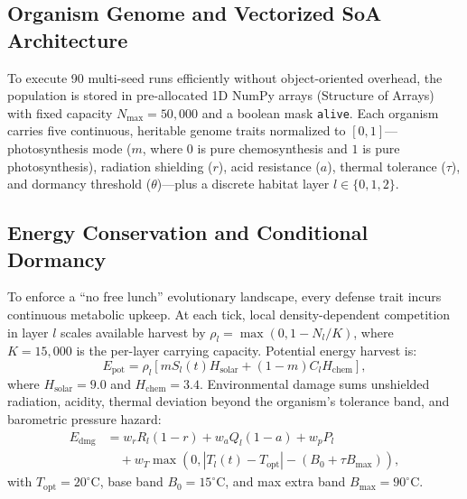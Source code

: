 \documentclass[conference]{IEEEtran}
\begin{document}
\subsection{Organism Genome and Vectorized SoA Architecture}
To execute 90 multi-seed runs efficiently without object-oriented overhead, the population is stored in pre-allocated 1D NumPy arrays (Structure of Arrays) with fixed capacity $N_{\max} = 50{,}000$ and a boolean mask \texttt{alive}. Each organism carries five continuous, heritable genome traits normalized to $[0, 1]$---photosynthesis mode ($m$, where $0$ is pure chemosynthesis and $1$ is pure photosynthesis), radiation shielding ($r$), acid resistance ($a$), thermal tolerance ($\tau$), and dormancy threshold ($\theta$)---plus a discrete habitat layer $l \in \{0, 1, 2\}$.

\subsection{Energy Conservation and Conditional Dormancy}
To enforce a ``no free lunch'' evolutionary landscape, every defense trait incurs continuous metabolic upkeep. At each tick, local density-dependent competition in layer $l$ scales available harvest by $\rho_l = \max(0, 1 - N_l / K)$, where $K = 15{,}000$ is the per-layer carrying capacity. Potential energy harvest is:
\begin{equation}
    E_{\text{pot}} = \rho_l \left[ m S_l(t) H_{\text{solar}} + (1 - m) C_l H_{\text{chem}} \right],
\end{equation}
where $H_{\text{solar}} = 9.0$ and $H_{\text{chem}} = 3.4$. Environmental damage sums unshielded radiation, acidity, thermal deviation beyond the organism's tolerance band, and barometric pressure hazard:
\begin{align}
    E_{\text{dmg}} &= w_r R_l (1 - r) + w_a Q_l (1 - a) + w_p P_l \nonumber \\
                   &\quad + w_T \max\left(0, |T_l(t) - T_{\text{opt}}| - (B_0 + \tau B_{\max})\right),
\end{align}
with $T_{\text{opt}} = 20^\circ\text{C}$, base band $B_0 = 15^\circ\text{C}$, and max extra band $B_{\max} = 90^\circ\text{C}$.
\end{document}
